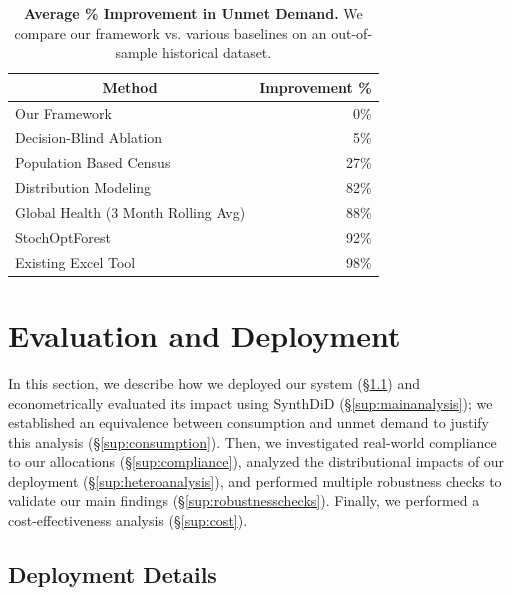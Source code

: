\documentclass[12pt]{article}
\begin{document}
\begin{table}[t]
\centering
\caption{\textbf{Average \% Improvement in Unmet Demand.} We compare our framework vs. various baselines on an out-of-sample historical dataset.}
\begin{tabular}{lr}
\toprule
\multicolumn{1}{c}{Method} & \multicolumn{1}{c}{Improvement \%} \\
\midrule
Our Framework & 0\% \\
Decision-Blind Ablation & 5\% \\
Population Based Census & 27\% \\
Distribution Modeling & 82\% \\
Global Health (3 Month Rolling Avg) & 88\% \\
StochOptForest & 92\% \\
Existing Excel Tool & 98\% \\
\bottomrule
\end{tabular}
\label{tab:improvement}
\end{table}

\section{Evaluation and Deployment}
\label{sup:evaldeploy}

In this section, we describe how we deployed our system (\S\ref{sup:deployment}) and econometrically evaluated its impact using SynthDiD (\S\ref{sup:mainanalysis}); we established an equivalence between consumption and unmet demand to justify this analysis (\S\ref{sup:consumption}). Then, we investigated real-world compliance to our allocations (\S\ref{sup:compliance}), analyzed the distributional impacts of our deployment (\S\ref{sup:heteroanalysis}), and performed multiple robustness checks to validate our main findings (\S\ref{sup:robustnesschecks}). Finally, we performed a cost-effectiveness analysis (\S\ref{sup:cost}).

\subsection{Deployment Details}
\label{sup:deployment}
\end{document}
